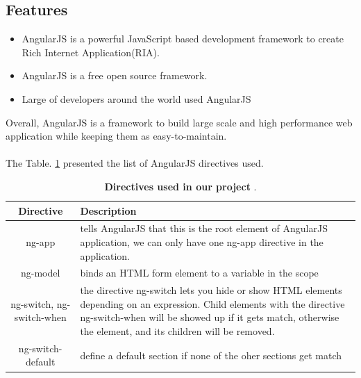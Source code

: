 	\subsection{Features}
	\begin{itemize}
		\item AngularJS is a powerful JavaScript based development framework to create Rich Internet Application(RIA).
		\item AngularJS is a free open source framework.
		\item Large of developers around the world used AngularJS
	\end{itemize}
		Overall, AngularJS is a framework to build large scale and high performance web application while keeping them as easy-to-maintain.
		\\
		\\
The Table. \ref{DUOP} presented the list of AngularJS directives used.
		\begin{table}[!b]
				\caption{\textbf{Directives used in our project }.}
			\label{DUOP}
				\centering
			\begin{tabular}{|c|p{10cm}|}	
				\hline
				\textbf{Directive} & \textbf{Description }\\
				\hline
				ng-app & tells AngularJS that this is the root element of AngularJS application, we can only have one ng-app directive in the application.
				\\
				\hline
				ng-model & binds an HTML form element to a variable in the scope  \\
				\hline
				ng-switch, ng-switch-when & the directive ng-switch lets you hide or show HTML elements depending on an expression. Child elements with the directive ng-switch-when will be showed up if it gets match, otherwise the element, and its children will be removed.
				\\
				\hline
				ng-switch-default & define a default section if none of the oher sections get match\\ 
					
				\hline
			\end{tabular} 
		\end{table}
	
